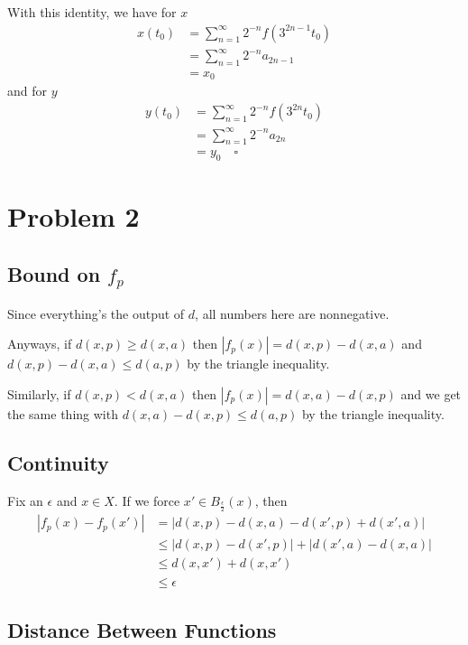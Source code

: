 \documentclass[12pt]{article}
\begin{document}
With this identity, we have for $x$
\begin{align*}
  x(t_0)
   & = \sum_{n=1}^{\infty} 2^{-n}f\left(3^{2n-1}t_0\right) \\
   & = \sum_{n=1}^{\infty} 2^{-n}a_{2n-1}                  \\
   & = x_0
\end{align*}
and for $y$
\begin{align*}
  y(t_0)
   & = \sum_{n=1}^{\infty} 2^{-n}f\left(3^{2n}t_0\right) \\
   & = \sum_{n=1}^{\infty} 2^{-n}a_{2n}                  \\
   & = y_0\quad\square
\end{align*}

\pagebreak

\section{Problem 2}

\subsection{Bound on \texorpdfstring{$f_p$}{f\_p}}

Since everything's the output of $d$, all numbers here are nonnegative.

Anyways, if $d(x, p) \ge d(x, a)$ then $|f_p(x)|=d(x, p)-d(x, a)$ and
$d(x, p)-d(x, a) \le d(a, p)$ by the triangle inequality.

Similarly, if $d(x, p) < d(x, a)$ then $|f_p(x)|=d(x, a)-d(x, p)$ and
we get the same thing with $d(x,a)-d(x,p) \le d(a, p)$ by the triangle inequality.

\subsection{Continuity}

Fix an $\epsilon$ and $x \in X$.
If we force $x' \in B_{\frac{\epsilon}{2}}(x)$, then
\begin{align*}
  |f_p(x)-f_p(x')|
   & = |d(x, p) - d(x, a) - d(x', p) + d(x', a)|     \\
   & \le |d(x, p) - d(x', p)| + |d(x', a) - d(x, a)| \\
   & \le d(x, x') + d(x, x')                         \\
   & \le \epsilon
\end{align*}

\subsection{Distance Between Functions}
\end{document}
